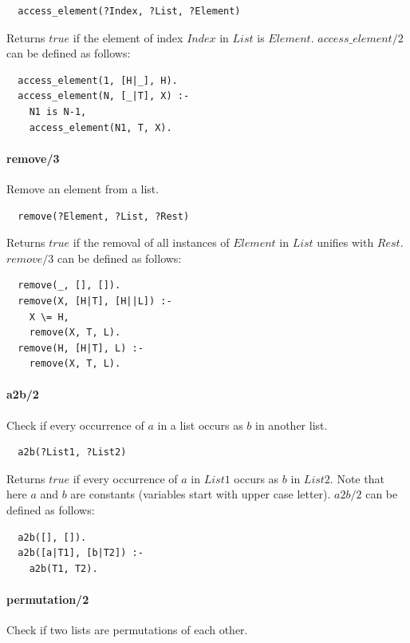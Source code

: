 \documentclass{article}
\begin{document}
\begin{multicols}{2}
  \begin{lstlisting}
  access_element(?Index, ?List, ?Element)
  \end{lstlisting}
  
  Returns $true$ if the element of index $Index$ in $List$ is $Element$. $access\_element/2$ can be defined as follows:

  \begin{lstlisting}
  access_element(1, [H|_], H).
  access_element(N, [_|T], X) :-
    N1 is N-1,
    access_element(N1, T, X).
  \end{lstlisting}
  
  \paragraph{remove/3} Remove an element from a list.
  
  \begin{lstlisting}
  remove(?Element, ?List, ?Rest)
  \end{lstlisting}
  
  Returns $true$ if the removal of all instances of $Element$ in $List$ unifies with $Rest$. $remove/3$ can be defined as follows:

  \begin{lstlisting}
  remove(_, [], []).
  remove(X, [H|T], [H||L]) :-
    X \= H,
    remove(X, T, L).
  remove(H, [H|T], L) :-
    remove(X, T, L).
  \end{lstlisting}  
  
  \paragraph{a2b/2} Check if every occurrence of $a$ in a list occurs as $b$ in another list.
  
  \begin{lstlisting}
  a2b(?List1, ?List2)
  \end{lstlisting}
  
  Returns $true$ if every occurrence of $a$ in $List1$ occurs as $b$ in $List2$. Note that here $a$ and $b$ are constants (variables start with upper case letter). $a2b/2$ can be defined as follows:

  \begin{lstlisting}
  a2b([], []).
  a2b([a|T1], [b|T2]) :-
    a2b(T1, T2).
  \end{lstlisting}   

  \paragraph{permutation/2} Check if two lists are permutations of each other.
  

\end{multicols}
\end{document}
